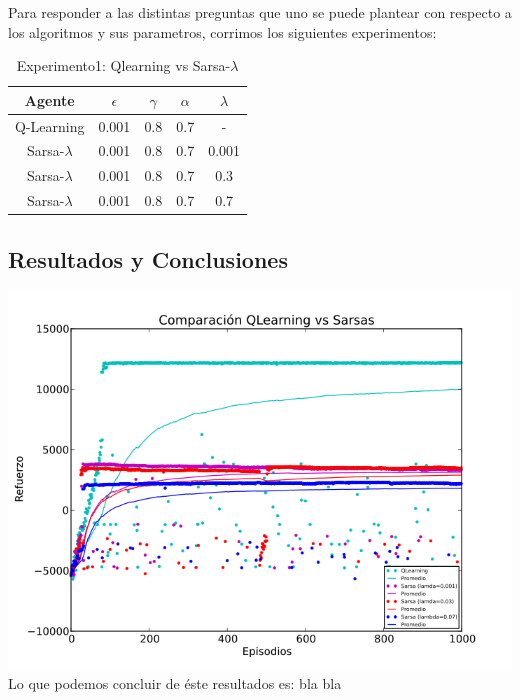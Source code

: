 \documentclass[11pt, a4paper]{article}
\begin{document}
Para responder a las distintas preguntas que uno se puede plantear con respecto a los algoritmos y sus parametros, corrimos los siguientes experimentos:

\bigskip

\begin{table}[h]
\center
\begin{tabular}{ | c | c | c | c | c| }
  \hline
  Agente & $\epsilon$ & $\gamma$ & $\alpha$ & $\lambda$ \\
  \hline 
 	 Q-Learning  & 0.001  & 0.8  & 0.7 & - \\
	Sarsa-$\lambda$  & 0.001  & 0.8  & 0.7 & 0.001 \\
	Sarsa-$\lambda$  & 0.001  & 0.8  & 0.7 & 0.3 \\
	Sarsa-$\lambda$  & 0.001  & 0.8  & 0.7 & 0.7\\
  \hline

\end{tabular}
\caption {Experimento1: Qlearning vs Sarsa-$\lambda$}
\end{table}

\newpage

\subsection{Resultados y Conclusiones}
\includegraphics[scale=0.6]{Graf1}
Lo que podemos concluir de \'este resultados es: bla bla
\end{document}
